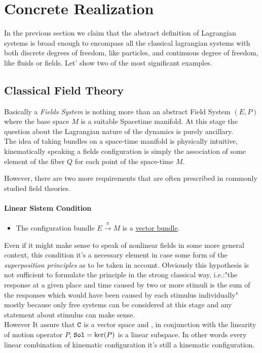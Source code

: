 \documentclass[Main]{subfiles}
\begin{document}
	\section{Concrete Realization}
	In the previous section we claim that the abstract definition of Lagrangian systems is broad enough to encompass all the classical lagrangian systems with both discrete degrees of freedom, like particles, and continuous degree of freedom, like fluids or fields.
	Let' show two of the most significant examples.
	
	
	
		\subsection{Classical Field Theory}
		Basically a \emph{Fields System} is nothing more than an abstract Field System $(E,P)$ where the base space $M$  is a suitable Spacetime manifold\cite{Bar}. At this stage the question about the Lagrangian nature of the dynamics is purely ancillary.
		\\		
		The idea of taking bundles on a space-time manifold is physically intuitive, kinematically speaking a fields configuration is simply the association of some element of the fiber $Q $ for each point of the space-time $M$.
		
		However, there are two more requirements that are often prescribed in commonly studied field theories.
		\paragraph{Linear Sistem Condition}		
			\begin{itemize}
				 \item The configuration bundle $E\xrightarrow{\pi} M$ is a \underline{vector bundle}.
			\end{itemize}
			Even if it might make sense to speak of nonlinear fields in some more general context, this condition it's a necessary element in case some form of the \emph{superposition principles} as to be taken in account.
			Obviously this hypothesis is not sufficient to formulate the principle in the strong classical way, i.e.:"the response at a given place and time caused by two or more stimuli is the sum of the responses which would have been caused by each stimulus individually" mostly because only free systems can be considered at this stage and any statement about stimulus can make sense.
			\\
			However It assure that $\mathtt{C}$ is a vector space and , in conjunction with the linearity of motion operator $P$, $\mathtt{Sol}= \ker(P)$ is a linear subspace.		
			In other words every linear combination of kinematic configuration it's still a kinematic configuration.
			 
\end{document}
